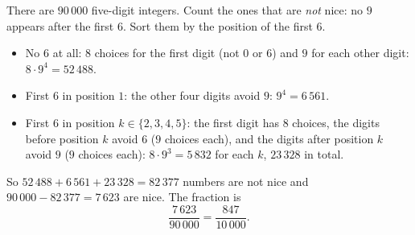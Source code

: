 There are $90\,000$ five-digit integers. Count the ones that are \emph{not} nice: no $9$ appears after the first $6$. Sort them by the position of the first $6$.
\begin{itemize}
\item No $6$ at all: $8$ choices for the first digit (not $0$ or $6$) and $9$ for each other digit: $8\cdot9^4=52\,488$.
\item First $6$ in position $1$: the other four digits avoid $9$: $9^4=6\,561$.
\item First $6$ in position $k\in\{2,3,4,5\}$: the first digit has $8$ choices, the digits before position $k$ avoid $6$ ($9$ choices each), and the digits after position $k$ avoid $9$ ($9$ choices each): $8\cdot9^{3}=5\,832$ for each $k$, $23\,328$ in total.
\end{itemize}
So $52\,488+6\,561+23\,328=82\,377$ numbers are not nice and $90\,000-82\,377=7\,623$ are nice. The fraction is
\[\dfrac{7\,623}{90\,000}=\boxed{\dfrac{847}{10\,000}}.\]
